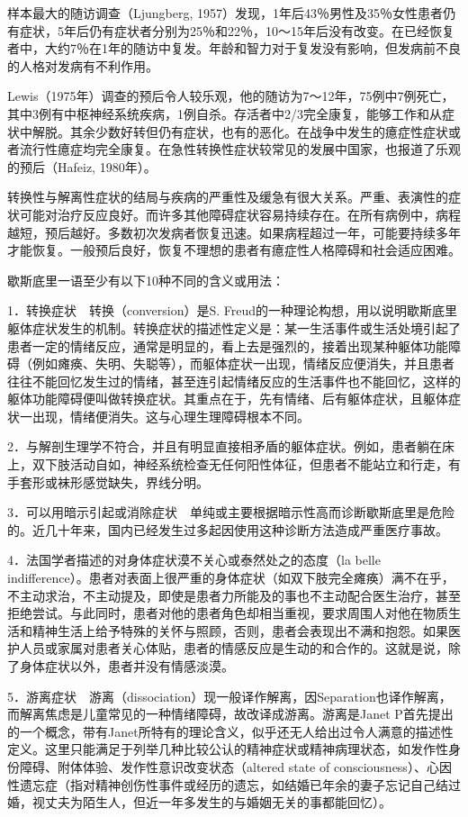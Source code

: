样本最大的随访调查（Ljungberg,
1957）发现，1年后43％男性及35％女性患者仍有症状，5年后仍有症状者分别为25％和22％，10～15年后没有改变。在已经恢复者中，大约7％在1年的随访中复发。年龄和智力对于复发没有影响，但发病前不良的人格对发病有不利作用。

Lewis（1975年）调查的预后令人较乐观，他的随访为7～12年，75例中7例死亡，其中3例有中枢神经系统疾病，1例自杀。存活者中2/3完全康复，能够工作和从症状中解脱。其余少数好转但仍有症状，也有的恶化。在战争中发生的癔症性症状或者流行性癔症均完全康复。在急性转换性症状较常见的发展中国家，也报道了乐观的预后（Hafeiz,
1980年）。

转换性与解离性症状的结局与疾病的严重性及缓急有很大关系。严重、表演性的症状可能对治疗反应良好。而许多其他障碍症状容易持续存在。在所有病例中，病程越短，预后越好。多数初次发病者恢复迅速。如果病程超过一年，可能要持续多年才能恢复。一般预后良好，恢复不理想的患者有癔症性人格障碍和社会适应困难。

歇斯底里一语至少有以下10种不同的含义或用法：

1．转换症状　转换（conversion）是S.
Freud的一种理论构想，用以说明歇斯底里躯体症状发生的机制。转换症状的描述性定义是：某一生活事件或生活处境引起了患者一定的情绪反应，通常是明显的，看上去是强烈的，接着出现某种躯体功能障碍（例如瘫痪、失明、失聪等），而躯体症状一出现，情绪反应便消失，并且患者往往不能回忆发生过的情绪，甚至连引起情绪反应的生活事件也不能回忆，这样的躯体功能障碍便叫做转换症状。其重点在于，先有情绪、后有躯体症状，且躯体症状一出现，情绪便消失。这与心理生理障碍根本不同。

2．与解剖生理学不符合，并且有明显直接相矛盾的躯体症状。例如，患者躺在床上，双下肢活动自如，神经系统检查无任何阳性体征，但患者不能站立和行走，有手套形或袜形感觉缺失，界线分明。

3．可以用暗示引起或消除症状　单纯或主要根据暗示性高而诊断歇斯底里是危险的。近几十年来，国内已经发生过多起因使用这种诊断方法造成严重医疗事故。

4．法国学者描述的对身体症状漠不关心或泰然处之的态度（la belle
indifference）。患者对表面上很严重的身体症状（如双下肢完全瘫痪）满不在乎，不主动求治，不主动提及，即使是患者力所能及的事也不主动配合医生治疗，甚至拒绝尝试。与此同时，患者对他的患者角色却相当重视，要求周围人对他在物质生活和精神生活上给予特殊的关怀与照顾，否则，患者会表现出不满和抱怨。如果医护人员或家属对患者关心体贴，患者的情感反应是生动的和合作的。这就是说，除了身体症状以外，患者并没有情感淡漠。

5．游离症状　游离（dissociation）现一般译作解离，因Separation也译作解离，而解离焦虑是儿童常见的一种情绪障碍，故改译成游离。游离是Janet
P首先提出的一个概念，带有Janet所特有的理论含义，似乎还无人给出过令人满意的描述性定义。这里只能满足于列举几种比较公认的精神症状或精神病理状态，如发作性身份障碍、附体体验、发作性意识改变状态（altered
state of
consciousness）、心因性遗忘症（指对精神创伤性事件或经历的遗忘，如结婚已年余的妻子忘记自己结过婚，视丈夫为陌生人，但近一年多发生的与婚姻无关的事都能回忆）。

